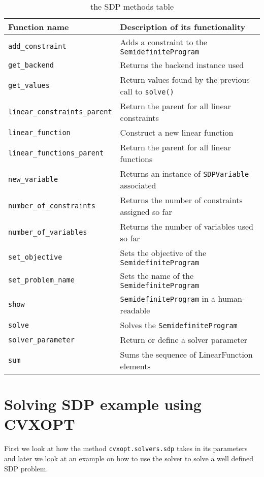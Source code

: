 \begin{table}
    \caption{the SDP methods table}
\label{table:sdp}
\begin{center}
  \begin{tabular}{ | l |  l |}
    \hline
Function name& Description of its functionality\\
    \hline    
 
\texttt{add\_constraint}&              Adds a constraint to the \texttt{SemidefiniteProgram}\\
\texttt{get\_backend}&                 Returns the backend instance used\\
\texttt{get\_values}&                  Return values found by the previous call to \texttt{solve()}\\
\texttt{linear\_constraints\_parent}&  Return the parent for all linear constraints\\
\texttt{linear\_function}&             Construct a new linear function\\
\texttt{linear\_functions\_parent}&     Return the parent for all linear functions\\
\texttt{new\_variable}&                Returns an instance of \texttt{SDPVariable} associated\\
\texttt{number\_of\_constraints}&      Returns the number of constraints assigned so far\\
\texttt{number\_of\_variables}&        Returns the number of variables used so far\\
\texttt{set\_objective}&               Sets the objective of the \texttt{SemidefiniteProgram}\\
\texttt{set\_problem\_name}&           Sets the name of the \texttt{SemidefiniteProgram}\\
\texttt{show}&                         \texttt{SemidefiniteProgram} in a human-readable\\
\texttt{solve}&                        Solves the \texttt{SemidefiniteProgram}\\
\texttt{solver\_parameter}&            Return or define a solver parameter\\
\texttt{sum}&                          Sums the sequence of LinearFunction elements\\
    \hline
  \end{tabular}
\end{center}
\end{table}


\section{Solving SDP example using CVXOPT}
First we look at how the method \texttt{cvxopt.solvers.sdp} takes in its parameters and later we look at an example on how to use the solver to solve a well defined SDP problem. 





